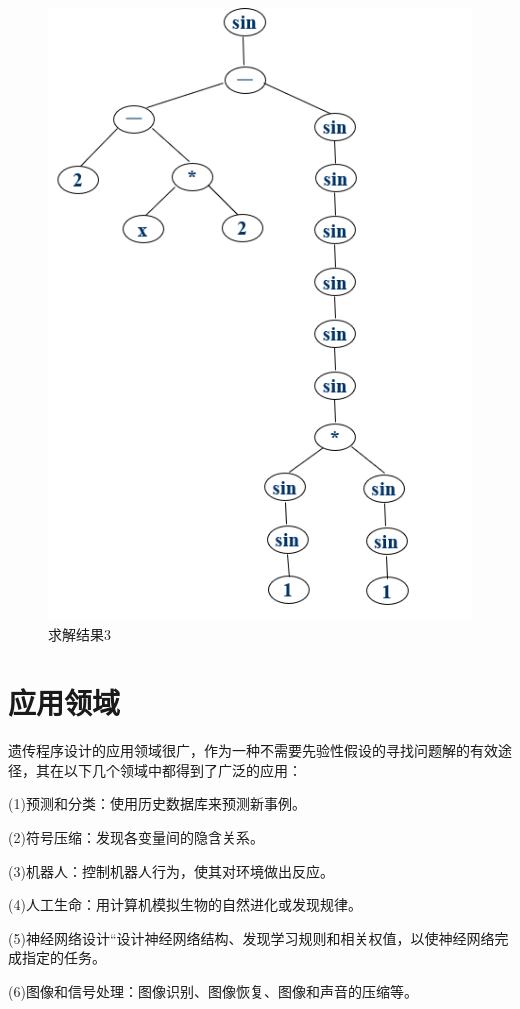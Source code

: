 \documentclass[UTF8]{ctexart}
\begin{document}
	\begin{figure}[ht]
		\centering	
		\includegraphics[scale=0.45]{images/A3.png}
		\caption{求解结果3}
		\label{fig:label}
	\end{figure}
\newpage
\section{应用领域}
遗传程序设计的应用领域很广，作为一种不需要先验性假设的寻找问题解的有效途径，其在以下几个领域中都得到了广泛的应用：

(1)预测和分类：使用历史数据库来预测新事例。

(2)符号压缩：发现各变量间的隐含关系。

(3)机器人：控制机器人行为，使其对环境做出反应。

(4)人工生命：用计算机模拟生物的自然进化或发现规律。

(5)神经网络设计“设计神经网络结构、发现学习规则和相关权值，以使神经网络完成指定的任务。

(6)图像和信号处理：图像识别、图像恢复、图像和声音的压缩等。
\end{document}
